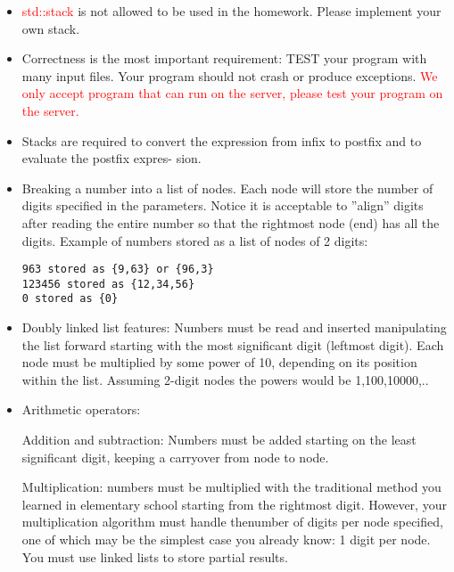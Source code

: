\begin{itemize}
\item \textcolor{red}{std::stack} is not allowed to be used in the homework. Please implement your own stack.
\item Correctness is the most important requirement: TEST your program with many input files. Your
program should not crash or produce exceptions. \textcolor{red}{We only accept program that can run on the server, please test your program on the server.}
\item Stacks are required to convert the expression from infix to postfix and to evaluate the postfix expres-
sion.


\item Breaking a number into a list of nodes. Each node will store the number of digits specified in the
parameters. Notice it is acceptable to ”align” digits after reading the entire number so that the rightmost node (end) has all the digits.
Example of numbers stored as a list of nodes of 2 digits:
\begin{verbatim}
963 stored as {9,63} or {96,3}
123456 stored as {12,34,56}
0 stored as {0}
\end{verbatim}
\item Doubly linked list features:
Numbers must be read and inserted manipulating the list forward starting with the most significant
digit (leftmost digit). Each node must be multiplied by some power of 10, depending on its position
within the list. Assuming 2-digit nodes the powers would be 1,100,10000,..
\item Arithmetic operators:

Addition and subtraction: Numbers must be added starting on the least significant digit, keeping a carryover from node to node.

Multiplication: numbers must be multiplied with the traditional method you learned in elementary school starting from the rightmost digit. However, your multiplication algorithm must handle thenumber of digits per node specified, one of which may be the simplest case you already know: 1 digit per node. You must use linked lists to store partial results.


\end{itemize}
